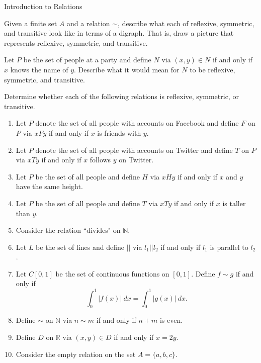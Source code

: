 \begin{section}{Introduction to Relations}
\begin{example}
\end{example}

\begin{exercise}
Given a finite set $A$ and a relation $\sim$, describe what each of reflexive, symmetric, and transitive look like in terms of a digraph. That is, draw a picture that represents reflexive, symmetric, and transitive.
\end{exercise}

\begin{exercise}
Let $P$ be the set of people at a party and define $N$ via $(x,y)\in N$ if and only if $x$ knows the name of $y$.  Describe what it would mean for $N$ to be reflexive, symmetric, and transitive.
\end{exercise}

\begin{exercise}\label{exer:lots of relations}
Determine whether each of the following relations is reflexive, symmetric, or transitive.
\begin{enumerate}[label=\textrm{(\alph*)}]
\item Let $P$ denote the set of all people with accounts on Facebook and define $F$ on $P$ via $xFy$ if and only if $x$ is friends with $y$. 
\item\label{exer:twitter} Let $P$ denote the set of all people with accounts on Twitter and define $T$ on $P$ via $xTy$ if and only if $x$ follows $y$ on Twitter. 
\item Let $P$ be the set of all people and define $H$ via $xHy$ if and only if $x$ and $y$ have the same height.
\item Let $P$ be the set of all people and define $T$ via $xTy$ if and only if $x$ is taller than $y$.
\item Consider the relation ``divides" on $\mathbb{N}$.
\item Let $L$ be the set of lines and define $||$ via $l_1||l_2$ if and only if $l_1$ is parallel to $l_2$.
\item Let $C[0,1]$ be the set of continuous functions on $[0,1]$.  Define $f\sim g$ if and only if
\[
\int_0^1|f(x)|\ dx=\int_0^1|g(x)|\ dx.
\]
\item Define $\sim$ on $\mathbb{N}$ via $n\sim m$ if and only if $n+m$ is even.
\item Define $D$ on $\mathbb{R}$ via $(x,y)\in D$ if and only if $x=2y$.
\item Consider the empty relation on the set $A=\{a,b,c\}$.
\end{enumerate}
\end{exercise}

\end{section}